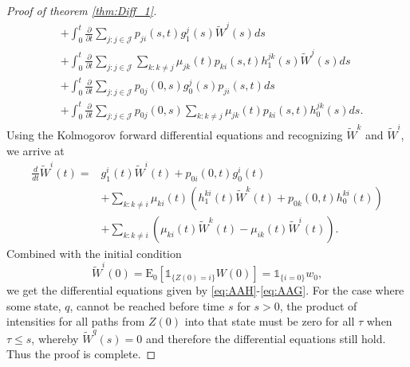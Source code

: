 \documentclass[12pt]{article}
\newcommand{\E}{\text{E}}
\newcommand{\indic}[1]{\mathds{1}_{ \{ #1 \} }}
\theoremstyle{my_thm}
\begin{document}
\begin{proof}[Proof of theorem \ref{thm:Diff_1}]
\begin{align*}
&+
\int_0^t \frac{\partial}{\partial t}  \sum_{j:j \in \mathcal{J}} p_{ji}(s,t) g_1^j(s) \tilde{W}^j(s)  ds
\\
&+
\int_0^t \frac{\partial}{\partial t}  \sum_{j:j \in \mathcal{J}} \sum_{k:k \neq j}  \mu_{jk}(t) p_{ki}(s,t)  h^{jk}_1(s) \tilde{W}^j(s)   ds
\\
&+
\int_0^t \frac{\partial}{\partial t}  \sum_{j:j \in \mathcal{J}} p_{0j}(0,s)g_0^j(s)p_{ji}(s,t) ds
\\
&+
\int_0^t \frac{\partial}{\partial t} \sum_{j:j \in \mathcal{J}} p_{0j}(0,s)  \sum_{k:k \neq j}  \mu_{jk}(t) p_{ki}(s,t)h_0^{jk}(s) ds.
\end{align*}
Using the Kolmogorov forward differential equations and recognizing $\tilde{W}^k$ and $\tilde{W}^i$, we arrive at
\begin{align*}
\frac{d}{dt}\tilde{W}^i(t)=&
g^i_1(t) \tilde{W}^i(t) +p_{0i}(0,t)g^i_0(t)\\
&+
\sum_{k:k \neq i} \mu_{ki}(t) \left(   h^{ki}_1(t) \tilde{W}^k(t) + p_{0k}(0,t)h^{ki}_0(t) \right)
\\
&+
\sum_{k:k \neq i}\left( \mu_{ki}(t) \tilde{W}^k(t)-\mu_{ik}(t)\tilde{W}^i(t)\right).
\end{align*}
Combined with the initial condition
$$
\tilde{W}^i(0)=\E_0[\indic{Z(0)=i}W(0)]=\indic{i=0}w_0,
$$
we get the differential equations given by \eqref{eq:AAH}-\eqref{eq:AAG}. For the case where some state, $q$, cannot be reached before time $s$ for $s>0$, the product of intensities for all paths from $Z(0)$ into that state must be zero for all $\tau$ when $\tau \leq s$, whereby $\tilde{W}^q(s)=0$ and therefore the differential equations still hold. Thus the proof is complete.
\end{proof}

\iffalse
\end{document}
